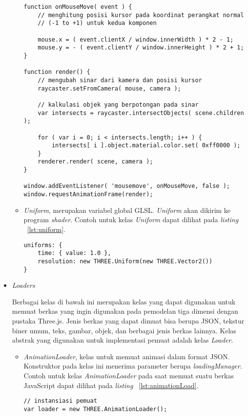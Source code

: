 \begin{itemize}
\begin{itemize}
\begin{lstlisting}[caption={Contoh penggunaan kelas {\it Raycaster}.}, label={lst:raycaster},captionpos=b]
function onMouseMove( event ) {
	// menghitung posisi kursor pada koordinat perangkat normal
	// (-1 to +1) untuk kedua komponen

	mouse.x = ( event.clientX / window.innerWidth ) * 2 - 1;
	mouse.y = - ( event.clientY / window.innerHeight ) * 2 + 1;
}

function render() {
	// mengubah sinar dari kamera dan posisi kursor
	raycaster.setFromCamera( mouse, camera );

	// kalkulasi objek yang berpotongan pada sinar
	var intersects = raycaster.intersectObjects( scene.children );

	for ( var i = 0; i < intersects.length; i++ ) {
		intersects[ i ].object.material.color.set( 0xff0000 );
	}
	renderer.render( scene, camera );
}

window.addEventListener( 'mousemove', onMouseMove, false );
window.requestAnimationFrame(render);
\end{lstlisting}
		\item{\it Uniform}, merupakan variabel global GLSL. {\it Uniform} akan dikirim ke program {\it shader}. Contoh untuk kelas {\it Uniform} dapat dilihat pada {\it listing} ~\ref{lst:uniform}.
	
\begin{lstlisting}[caption={Contoh penggunaan kelas {\it Uniform} yang diinisialisasi dengan nilai atau objek.}, label={lst:uniform},captionpos=b]
uniforms: {
	time: { value: 1.0 },
	resolution: new THREE.Uniform(new THREE.Vector2())
}
\end{lstlisting}
	\end{itemize}
	
	\item \textit{Loaders}
	
		Berbagai kelas di bawah ini merupakan kelas yang dapat digunakan untuk memuat berkas yang ingin digunakan pada pemodelan tiga dimensi dengan pustaka Three.js. Jenis berkas yang dapat dimuat bisa berupa JSON, tekstur biner umum, teks, gambar, objek, dan berbagai jenis berkas lainnya. Kelas abstrak yang digunakan untuk implementasi pemuat adalah kelas {\it Loader}.
	
	\begin{itemize}
		\item {\it AnimationLoader}, kelas untuk memuat animasi dalam format JSON. Konstruktor pada kelas ini menerima parameter berupa {\it loadingManager}. Contoh untuk kelas {\it AnimationLoader} pada saat memuat suatu berkas JavaScript dapat dilihat pada {\it listing} ~\ref{lst:animationLoad}.
\begin{lstlisting}[caption={Contoh penggunaan kelas {\it AnimationLoader}.}, label={lst:animationLoad},captionpos=b]
// instansiasi pemuat
var loader = new THREE.AnimationLoader();


\end{lstlisting}
\end{itemize}
\end{itemize}
